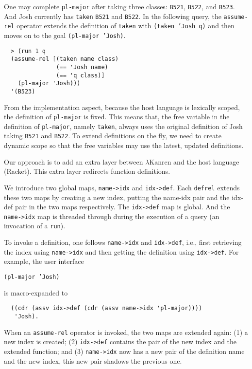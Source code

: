 \documentclass[acmlarge,review]{acmart}
\theoremstyle{definition}
\begin{document}
One may complete \texttt{pl-major} after taking three classes: \texttt{B521},
\texttt{B522}, and \texttt{B523}. And Josh currently has \texttt{taken}
\texttt{B521} and \texttt{B522}. In the following query, the \texttt{assume-rel}
operator extends the definition of \texttt{taken} with \texttt{(taken 'Josh q)}
and then moves on to the goal \texttt{(pl-major 'Josh)}.

\begin{lstlisting}
  > (run 1 q
  (assume-rel [(taken name class)
               (== 'Josh name)
               (== 'q class)]
    (pl-major 'Josh)))
  '(B523)
\end{lstlisting}

From the implementation aspect, because the host language is lexically scoped,
the definition of \texttt{pl-major} is fixed. This means that, the free variable
in the definition of \texttt{pl-major}, namely \texttt{taken}, always uses the
original definition of Josh taking \texttt{B521} and \texttt{B522}. 
To extend definitions on the fly, we need to create dynamic scope so that the
free variables may use the latest, updated definitions.

Our approach is to add an extra layer between $\lambda$Kanren and the host
language (Racket). This extra layer redirects function definitions.

We introduce two global maps,
\texttt{name->idx} and \texttt{idx->def}. Each \texttt{defrel} extends these
two maps by creating a new index, putting the name-idx pair and the
idx-def pair in the two maps respectively.
The \texttt{idx->def} map is global. And the \texttt{name->idx}
map is threaded through during the execution of
a query (an invocation of a \texttt{run}).

To invoke a definition, one follows \texttt{name->idx} and
\texttt{idx->def}, i.e., first retrieving the index using \texttt{name->idx}
and then getting the definition using \texttt{idx->def}.
For example, the user interface

{\centering
  \texttt{(pl-major 'Josh)}

}
\noindent is macro-expanded to

\begin{lstlisting}
  ((cdr (assv idx->def (cdr (assv name->idx 'pl-major))))
   'Josh).
\end{lstlisting}

When an \texttt{assume-rel} operator is invoked, the two maps are extended
again: (1) a new index is created; (2) \texttt{idx->def} contains the pair of
the new index and the extended function; and (3) \texttt{name->idx} now has
a new pair of the definition name and the new index, this new pair shadows the
previous one.
\end{document}
